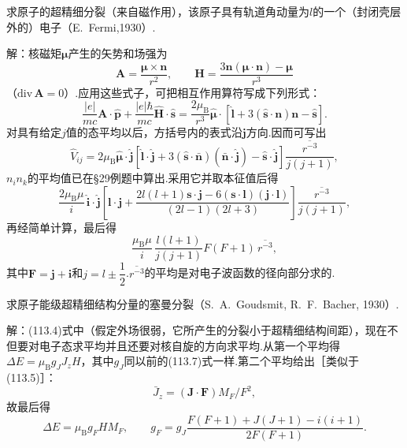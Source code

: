 \begin{xiti}

\quad 求原子的超精细分裂（来自磁作用），该原子具有轨道角动量为$l$的一个（封闭壳层外的）电子（E.~Fermi,1930）.

解：核磁矩$\boldsymbol{\mu}$产生的矢势和场强为
\begin{equation*}
  \boldsymbol{A}=\frac{\boldsymbol{\mu}\times\boldsymbol{n}}{r^2},\qquad
  \boldsymbol{H}=\frac{3\boldsymbol{n}(\boldsymbol{\mu}\cdot\boldsymbol{n})-\boldsymbol{\mu}}{r^3}
\end{equation*}
（$\mathrm{div}\,\boldsymbol{A}=0$）.应用这些式子，可把相互作用算符写成下列形式：
\begin{equation*}
  \frac{|e|}{mc}\boldsymbol{A}\cdot\hat{\boldsymbol{p}}
  +\frac{|e|\hbar}{mc}\hat{\boldsymbol{H}}\cdot\hat{\boldsymbol{s}}
  =\frac{2\mu_\mathrm{B}}{r^3}\hat{\boldsymbol{\mu}}\cdot
  \left[\hat{\boldsymbol{l}}+3(\hat{\boldsymbol{s}}\cdot\boldsymbol{n})\boldsymbol{n}-\hat{\boldsymbol{s}}\right].
\end{equation*}
对具有给定$j$值的态平均以后，方括号内的表式沿$\boldsymbol{j}$方向.因而可写出
\begin{equation*}
  \hat{V}_{ij}=2\mu_\mathrm{B}\hat{\boldsymbol{\mu}}\cdot\hat{\boldsymbol{j}}
  \left[\hat{\boldsymbol{l}}\cdot\hat{\boldsymbol{j}}
  +3(\hat{\boldsymbol{s}}\cdot\bar{\boldsymbol{n}})(\bar{\boldsymbol{n}}\cdot\hat{\boldsymbol{j}})
  -\hat{\boldsymbol{s}}\cdot\hat{\boldsymbol{j}}\right]
  \frac{\overline{r^{-3}}}{j(j+1)},
\end{equation*}
$n_in_k$的平均值已在§29例题中算出.采用它并取本征值后得
\begin{equation*}
  \frac{2\mu_\mathrm{B}\mu}{i}\,\hat{\boldsymbol{i}}\cdot\hat{\boldsymbol{j}}
  \left[\boldsymbol{l}\cdot\boldsymbol{j}
  +\frac{2l(l+1)\boldsymbol{s}\cdot\boldsymbol{j}-6(\boldsymbol{s}\cdot\boldsymbol{l})(\boldsymbol{j}\cdot\boldsymbol{l})}{(2l-1)(2l+3)}\right]
  \frac{\overline{r^{-3}}}{j(j+1)},
\end{equation*}
再经简单计算，最后得
\begin{equation*}
  \frac{\mu_\mathrm{B}\mu}{i}\,\frac{l(l+1)}{j(j+1)}F(F+1)\,\overline{r^{-3}},
\end{equation*}
其中$\boldsymbol{F}=\boldsymbol{j}+\boldsymbol{i}$和$j=l\pm\dfrac{1}{2}$.$\overline{r^{-3}}$的平均是对电子波函数的径向部分求的.

\quad 求原子能级超精细结构分量的塞曼分裂（S.~A.~Goudsmit, R.~F.~Bacher, 1930）.

解：(113.4)式中（假定外场很弱，它所产生的分裂小于超精细结构间距），现在不但要对电子态求平均并且还要对核自旋的方向求平均.从第一个平均得$\Delta E=\mu_\mathrm{B}g_JJ_zH$，其中$g_J$同以前的(113.7)式一样.第二个平均给出［类似于(113.5)］：
\begin{equation*}
  \bar{J}_z=(\boldsymbol{J}\cdot\boldsymbol{F})M_F/F^2,
\end{equation*}
故最后得
\begin{equation*}
  \Delta E=\mu_\mathrm{B}g_FHM_F,\qquad
  g_F=g_J\frac{F(F+1)+J(J+1)-i(i+1)}{2F(F+1)}.
\end{equation*}

\end{xiti}

